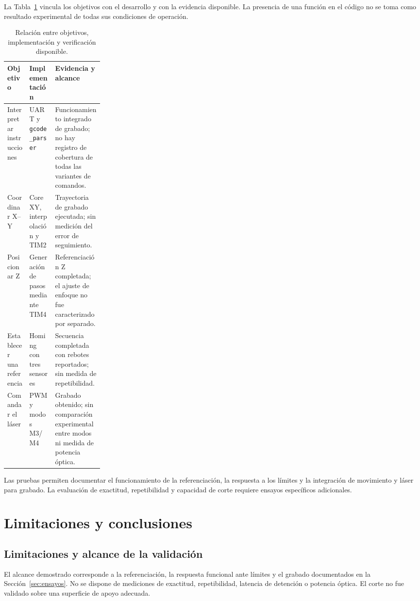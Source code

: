 \documentclass[blue,fullpaper]{ludusofficial}  %
\begin{document}
La Tabla~\ref{tab:objetivos-evidencia} vincula los objetivos
con el desarrollo y con la evidencia disponible.
La presencia de una función en el código no se toma
como resultado experimental de todas sus condiciones
de operación.

\begin{table}[htbp]
\centering\small
\caption{Relación entre objetivos, implementación y verificación disponible.}
\label{tab:objetivos-evidencia}
\begin{tabularx}{\linewidth}{p{0.23\linewidth}XX}
\hline
Objetivo & Implementación & Evidencia y alcance \\
\hline
Interpretar instrucciones & UART y \texttt{gcode\_parser} & Funcionamiento integrado de grabado; no hay registro de cobertura de todas las variantes de comandos. \\
Coordinar X--Y & CoreXY, interpolación y TIM2 & Trayectoria de grabado ejecutada; sin medición del error de seguimiento. \\
Posicionar Z & Generación de pasos mediante TIM4 & Referenciación Z completada; el ajuste de enfoque no fue caracterizado por separado. \\
Establecer una referencia & Homing con tres sensores & Secuencia completada con rebotes reportados; sin medida de repetibilidad. \\
Comandar el láser & PWM y modos M3/M4 & Grabado obtenido; sin comparación experimental entre modos ni medida de potencia óptica. \\
\hline
\end{tabularx}
\end{table}

Las pruebas permiten documentar el funcionamiento
de la referenciación, la respuesta a los límites
y la integración de movimiento y láser para grabado.
La evaluación de exactitud, repetibilidad y capacidad
de corte requiere ensayos específicos adicionales.


\section{Limitaciones y conclusiones}
\subsection{Limitaciones y alcance de la validación}
\label{subsec:limites-validacion}

El alcance demostrado corresponde a la referenciación,
la respuesta funcional ante límites y el grabado
documentados en la Sección~\ref{sec:ensayos}.
No se dispone de mediciones de exactitud, repetibilidad,
latencia de detención o potencia óptica. El corte
no fue validado sobre una superficie de apoyo adecuada.
\end{document}
